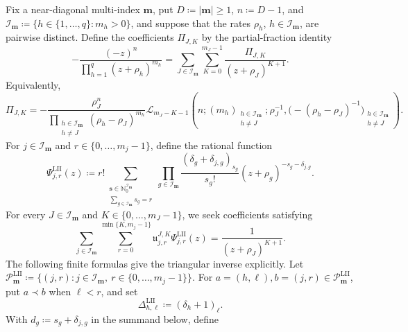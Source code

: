 \documentclass[10pt]{amsart}
\newcommand{\mm}{\boldsymbol m}
\newcommand{\abs}[1]{\lvert#1\rvert}
\theoremstyle{plain}
\theoremstyle{definition}
\theoremstyle{remark}
\begin{document}
Fix a near-diagonal multi-index \(\mm\), put
\(D\coloneq\abs\mm\ge1\), \(n\coloneq D-1\), and
\(\mathcal I_{\mm}\coloneq\{h\in\{1,\ldots,q\}:m_h>0\}\), and suppose that the rates
\(\rho_h\), \(h\in\mathcal I_{\mm}\), are
pairwise distinct. Define the coefficients
\(\Pi_{J,K}\) by the partial-fraction identity
\begin{equation}
 -\frac{(-z)^n}{\prod_{h=1}^q(z+\rho_h)^{m_h}}
 =\sum_{J\in\mathcal I_{\mm}}
  \sum_{K=0}^{m_J-1}\frac{\Pi_{J,K}}{(z+\rho_J)^{K+1}}.
 \label{eq:LII-component-partial-fractions}
\end{equation}
Equivalently,
\begin{equation}
 \Pi_{J,K}
 =-\frac{\rho_J^n}
 {\prod_{\substack{h\in\mathcal I_{\mm}\\h\ne J}}
  (\rho_h-\rho_J)^{m_h}}
 \mathscr L_{m_J-K-1}
 \left(
 n;(m_h)_{\substack{h\in\mathcal I_{\mm}\\h\ne J}};\rho_J^{-1},
 \bigl(-(\rho_h-\rho_J)^{-1}\bigr)_{
       \substack{h\in\mathcal I_{\mm}\\h\ne J}}
 \right).
 \label{eq:LII-component-Pi}
\end{equation}
For \(j\in\mathcal I_{\mm}\) and \(r\in\{0,\ldots,m_j-1\}\), define
the rational function
\begin{equation}
\Psi_{j,r}^{\mathrm{LII}}(z)
 \coloneq r!\sum_{\substack{\boldsymbol s\in
                     \mathbb N_0^{\mathcal I_{\mm}}\\
                     \sum_{g\in\mathcal I_{\mm}}s_g=r}}
 \prod_{g\in\mathcal I_{\mm}}
 \frac{(\delta_g+\delta_{j,g})_{s_g}}{s_g!}
 (z+\rho_g)^{-s_g-\delta_{j,g}}.
\label{eq:LII-component-Psi}
\end{equation}
For every \(J\in\mathcal I_{\mm}\) and
\(K\in\{0,\ldots,m_J-1\}\), we seek coefficients satisfying
\begin{equation}
 \sum_{j\in\mathcal I_{\mm}}
 \sum_{r=0}^{\min\{K,m_j-1\}}
 \mathfrak u_{j,r}^{J,K}\Psi_{j,r}^{\mathrm{LII}}(z)
 =\frac1{(z+\rho_J)^{K+1}}.
 \label{eq:LII-component-target}
\end{equation}
The following finite formulas give the triangular inverse explicitly.
Let \(\mathscr P_{\mm}^{\mathrm{LII}}
\coloneq\{(j,r):j\in\mathcal I_{\mm},\
r\in\{0,\ldots,m_j-1\}\}\).
For \(a=(h,\ell),b=(j,r)\in\mathscr P_{\mm}^{\mathrm{LII}}\), put
\(a\prec b\) when \(\ell<r\), and set
\begin{equation}
 \Delta_{h,\ell}^{\mathrm{LII}}\coloneq(\delta_h+1)_\ell .
 \label{eq:LII-component-pivots}
\end{equation}
With \(d_g\coloneq s_g+\delta_{j,g}\) in the summand below, define
\end{document}

